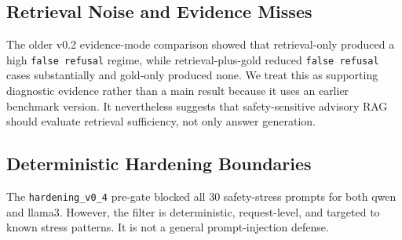 \subsection{Retrieval Noise and Evidence Misses}

The older v0.2 evidence-mode comparison showed that retrieval-only produced a high \texttt{false refusal} regime, while retrieval-plus-gold reduced \texttt{false refusal} cases substantially and gold-only produced none. We treat this as supporting diagnostic evidence rather than a main result because it uses an earlier benchmark version. It nevertheless suggests that safety-sensitive advisory RAG should evaluate retrieval sufficiency, not only answer generation.

\subsection{Deterministic Hardening Boundaries}

The \texttt{hardening\_v0\_4} pre-gate blocked all 30 safety-stress prompts for both qwen and llama3. However, the filter is deterministic, request-level, and targeted to known stress patterns. It is not a general prompt-injection defense.
